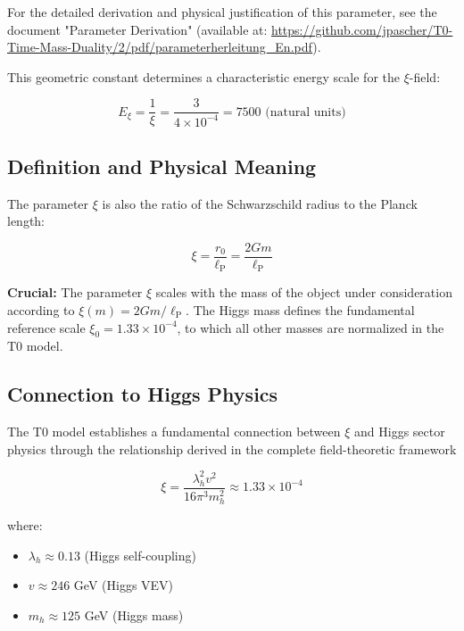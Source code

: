 \documentclass[12pt,a4paper]{article}
\newcommand{\xipar}{\xi}
\newcommand{\lP}{\ell_{\text{P}}}
\newcommand{\lambdah}{\lambda_h}
\newcommand{\pichar}{\pi}
\begin{document}
		For the detailed derivation and physical justification of this parameter, see the document "Parameter Derivation" (available at: \url{https://github.com/jpascher/T0-Time-Mass-Duality/2/pdf/parameterherleitung_En.pdf}).

	
	This geometric constant determines a characteristic energy scale for the $\xi$-field:
	
	\begin{equation}
		E_\xi = \frac{1}{\xi} = \frac{3}{4 \times 10^{-4}} = 7500 \text{ (natural units)}
	\end{equation}
	\subsection{Definition and Physical Meaning}
	\label{subsec:xi_definition}
	
	The parameter $\xipar$ is also the ratio of the Schwarzschild radius to the Planck length:
	
	\begin{equation}
		\xipar = \frac{r_0}{\lP} = \frac{2Gm}{\lP}
		\label{eq:xi_definition}
	\end{equation}
	
\textbf{Crucial:} The parameter $\xipar$ scales with the mass of the object under consideration according to $\xipar(m) = 2Gm/\lP$. The Higgs mass defines the fundamental reference scale $\xipar_0 = 1.33 \times 10^{-4}$, to which all other masses are normalized in the T0 model.
	
	\subsection{Connection to Higgs Physics}
	\label{subsec:xi_higgs_connection}
	
	The T0 model establishes a fundamental connection between $\xipar$ and Higgs sector physics through the relationship derived in the complete field-theoretic framework 
	
	\begin{equation}
		\xipar = \frac{\lambdah^2 v^2}{16\pichar^3 m_h^2} \approx 1.33 \times 10^{-4}
		\label{eq:xi_higgs_fundamental}
	\end{equation}
	
	where:
	\begin{itemize}
		\item $\lambdah \approx 0.13$ (Higgs self-coupling)
		\item $v \approx 246$ GeV (Higgs VEV)
		\item $m_h \approx 125$ GeV (Higgs mass)
	\end{itemize}
	
\end{document}
